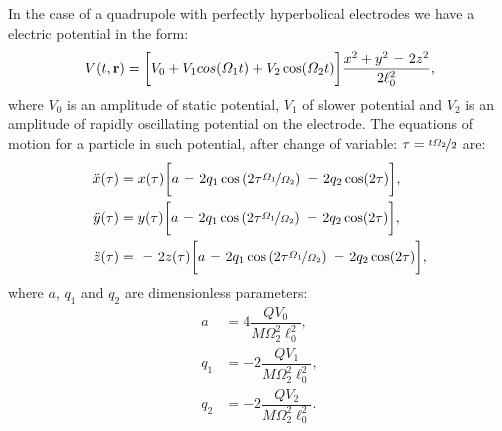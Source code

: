 In the case of a quadrupole with perfectly hyperbolical electrodes we have a electric potential in the form:
\begin{equation}
	V(t, \vb{r}) = \bigg[ V_0 + V_1 cos(\Omega_1 t) + V_2 \cos(\Omega_2 t) \bigg] \frac{x^2 + y^2 \minus 2 z^2 }{2 \ell_0^2},
\end{equation}
where $V_0$ is an amplitude of static potential, $V_1$ of slower potential and $V_2$ is an amplitude of rapidly oscillating potential on the electrode. The equations of motion for a particle in such potential, after change of variable: $\tau = \nicefrac{t\Omega_2}{2}$ are:
\begin{subequations}
\label{eq of motion for simulation}
\begin{align}
	\ddot{x}(\tau) & = x(\tau) \bigg[ a \minus 2 q_1 \cos\left(2 \tau \nicefrac{\Omega_1}{\Omega_2} \right) \minus 2 q_2 \cos(2\tau) \bigg], \\
	\ddot{y}(\tau) & = y(\tau) \bigg[ a \minus 2 q_1 \cos\left(2 \tau \nicefrac{\Omega_1}{\Omega_2} \right) \minus 2 q_2 \cos(2\tau) \bigg], \\
	\label{studied eq of motion}
	\ddot{z}(\tau) & = \minus 2z(\tau) \bigg[ a \minus 2 q_1 \cos\left(2 \tau \nicefrac{\Omega_1}{\Omega_2} \right) \minus 2 q_2 \cos(2\tau) \bigg],
\end{align}
\end{subequations}
where $a$, $q_1$ and $q_2$ are dimensionless parameters:
\begin{subequations}
\begin{align}
	\label{a}
	a & = 4 \dfrac{Q V_0}{M\Omega_2^2 \ell_0^2}, \\
	\label{q_1}
	q_1 & = \minus 2 \dfrac{Q V_1}{M\Omega_2^2 \ell_0^2}, \\
	\label{q_2}
	q_2 & = \minus 2 \dfrac{Q V_2}{M\Omega_2^2 \ell_0^2}.
\end{align}
\end{subequations}

